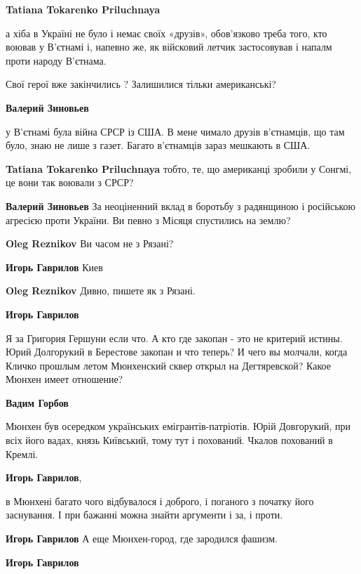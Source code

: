 \begin{itemize}
\begin{itemize}
\begin{itemize}
\textbf{Tatiana Tokarenko Priluchnaya} 

а хіба в Україні не було і немає своїх «друзів», обов'язково треба того, кто
воював у В'єтнамі і, напевно же, як війсковий летчик застосовував і напалм
проти народу В'єтнама.

Свої герої вже закінчились ? Залишилися тільки американські?

\textbf{Валерий Зиновьев} 

у В'єтнамі була війна СРСР із США. В мене чимало друзів в'єтнамців, що там
було, знаю не лише з газет. Багато в'єтнамців зараз мешкають в США.

\textbf{Tatiana Tokarenko Priluchnaya} тобто, те, що американці зробили у Сонгмі, це вони так воювали з СРСР?

\textbf{Валерий Зиновьев} За неоціненний вклад в боротьбу з радянщиною і російською агресією проти України. Ви певно з Місяця спустились на землю?

\textbf{Oleg Reznikov} Ви часом не з Рязані?

\textbf{Игорь Гаврилов} Киев

\textbf{Oleg Reznikov} Дивно, пишете як з Рязані.
\end{itemize} %

\textbf{Игорь Гаврилов} 

Я за Григория Гершуни если что. А кто где закопан - это не критерий истины.
Юрий Долгорукий в Берестове закопан и что теперь? И чего вы молчали, когда
Кличко прошлым летом Мюнхенский сквер открыл на Дегтяревской? Какое Мюнхен
имеет отношение?

\begin{itemize} %
\textbf{Вадим Горбов} 

Мюнхен був осередком українських емігрантів-патріотів. Юрій Довгорукий, при всіх
його вадах, князь Київський, тому тут і похований. Чкалов похований в Кремлі.

\textbf{Игорь Гаврилов}, 

в Мюнхені багато чого відбувалося і доброго, і поганого з початку його
заснування. І при бажанні можна знайти аргументи і за, і проти.


\textbf{Игорь Гаврилов} А еще Мюнхен-город, где зародился фашизм.

\textbf{Игорь Гаврилов} 


\end{itemize}
\end{itemize}
\end{itemize}
